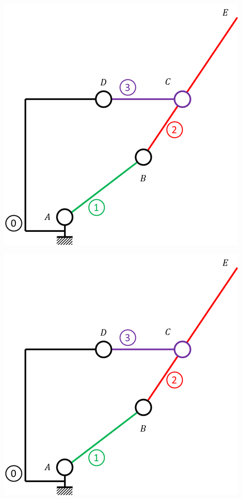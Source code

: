 \documentclass[10pt]{article}
\begin{document}
\begin{minipage}[c]{.48\linewidth}
\begin{center}
\includegraphics[width=\textwidth]{images/schema}
\end{center}
\end{minipage} \hfill
\begin{minipage}[c]{.48\linewidth}
\begin{center}
\includegraphics[width=\textwidth]{images/schema}
\end{center}
\end{minipage}
\end{document}
